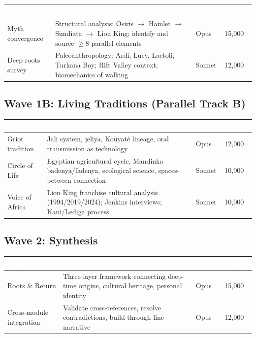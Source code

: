 \documentclass[11pt,letterpaper]{article}
\newcommand{\tableheader}[1]{\textbf{\sffamily\textcolor{white}{#1}}}
\begin{document}
\begin{center}
\begin{tabularx}{\textwidth}{L{3cm}XC{1.5cm}C{1.5cm}}
\toprule
{}
\tableheader{Task} & \tableheader{Description} & \tableheader{Model} & \tableheader{Tokens} \\
\midrule
Myth convergence & Structural analysis: Osiris $\rightarrow$ Hamlet $\rightarrow$ Sundiata $\rightarrow$ Lion King; identify and source $\geq$8 parallel elements & Opus & 15,000 \\
Deep roots survey & Paleoanthropology: Ardi, Lucy, Laetoli, Turkana Boy; Rift Valley context; biomechanics of walking & Sonnet & 12,000 \\
\bottomrule
\end{tabularx}
\end{center}

\subsection{Wave 1B: Living Traditions (Parallel Track B)}

\begin{center}
\begin{tabularx}{\textwidth}{L{3cm}XC{1.5cm}C{1.5cm}}
\toprule
{}
\tableheader{Task} & \tableheader{Description} & \tableheader{Model} & \tableheader{Tokens} \\
\midrule
Griot tradition & Jali system, jeliya, Kouyat\'{e} lineage, oral transmission as technology & Opus & 12,000 \\
Circle of Life & Egyptian agricultural cycle, Mandinka badenya/fadenya, ecological science, spaces-between connection & Sonnet & 10,000 \\
Voice of Africa & Lion King franchise cultural analysis (1994/2019/2024); Jenkins interviews; Kani/Lediga process & Sonnet & 10,000 \\
\bottomrule
\end{tabularx}
\end{center}

\subsection{Wave 2: Synthesis}

\begin{center}
\begin{tabularx}{\textwidth}{L{3cm}XC{1.5cm}C{1.5cm}}
\toprule
{}
\tableheader{Task} & \tableheader{Description} & \tableheader{Model} & \tableheader{Tokens} \\
\midrule
Roots \& Return & Three-layer framework connecting deep-time origins, cultural heritage, personal identity & Opus & 15,000 \\
Cross-module integration & Validate cross-references, resolve contradictions, build through-line narrative & Opus & 12,000 \\
\bottomrule
\end{tabularx}
\end{center}
\end{document}
